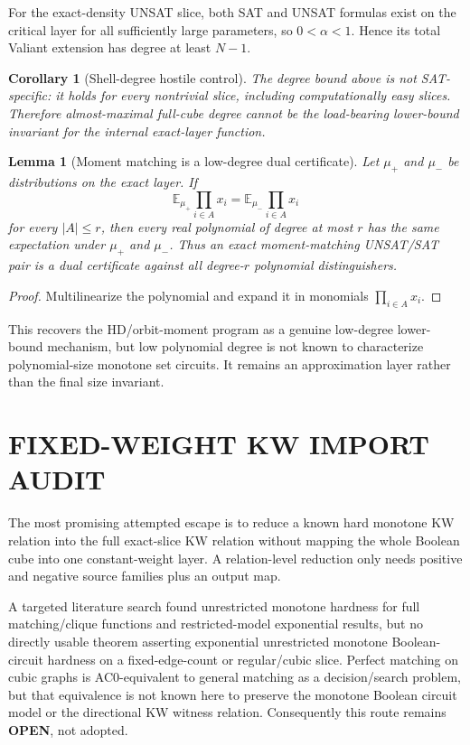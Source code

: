 \documentclass[11pt]{article}
\newtheorem{lemma}[theorem]{Lemma}
\newtheorem{corollary}[theorem]{Corollary}
\begin{document}
For the exact-density UNSAT slice, both SAT and UNSAT formulas exist on the critical layer for all sufficiently large parameters, so $0<\alpha<1$. Hence its total Valiant extension has degree at least $N-1$.

\begin{corollary}[Shell-degree hostile control]
The degree bound above is not SAT-specific: it holds for every nontrivial slice, including computationally easy slices. Therefore almost-maximal full-cube degree cannot be the load-bearing lower-bound invariant for the internal exact-layer function.
\end{corollary}

\begin{lemma}[Moment matching is a low-degree dual certificate]
Let $\mu_+$ and $\mu_-$ be distributions on the exact layer. If
\[\mathbb E_{\mu_+}\prod_{i\in A}x_i=\mathbb E_{\mu_-}\prod_{i\in A}x_i\]
for every $|A|\le r$, then every real polynomial of degree at most $r$ has the same expectation under $\mu_+$ and $\mu_-$. Thus an exact moment-matching UNSAT/SAT pair is a dual certificate against all degree-$r$ polynomial distinguishers.
\end{lemma}
\begin{proof}
Multilinearize the polynomial and expand it in monomials $\prod_{i\in A}x_i$.
\end{proof}

This recovers the HD/orbit-moment program as a genuine low-degree lower-bound mechanism, but low polynomial degree is not known to characterize polynomial-size monotone set circuits. It remains an approximation layer rather than the final size invariant.

\section{FIXED-WEIGHT KW IMPORT AUDIT}
The most promising attempted escape is to reduce a known hard monotone KW relation into the full exact-slice KW relation without mapping the whole Boolean cube into one constant-weight layer. A relation-level reduction only needs positive and negative source families plus an output map.

A targeted literature search found unrestricted monotone hardness for full matching/clique functions and restricted-model exponential results, but no directly usable theorem asserting exponential unrestricted monotone Boolean-circuit hardness on a fixed-edge-count or regular/cubic slice. Perfect matching on cubic graphs is AC0-equivalent to general matching as a decision/search problem, but that equivalence is not known here to preserve the monotone Boolean circuit model or the directional KW witness relation. Consequently this route remains \textbf{OPEN}, not adopted.
\end{document}
